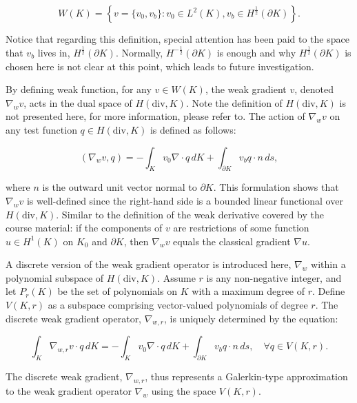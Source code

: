 \documentclass[12pt]{article} %
\begin{document}
\begin{equation}
    W(K) = \left\{ v = \{v_0, v_b\} : v_0 \in L^2(K), v_b \in H^{\frac{1}{2}}(\partial K) \right\}.
\end{equation}

Notice that regarding this definition, special attention has been paid to the space that $v_b$ lives in, $H^{\frac{1}{2}}(\partial K)$. Normally, $H^{-\frac{1}{2}}(\partial K)$ is enough and why $H^{\frac{1}{2}}(\partial K)$ is chosen here is not clear at this point, which leads to future investigation.

By defining weak function, for any \(v \in W(K)\), the weak gradient \(v\), denoted \(\nabla_w v\), acts in the dual space of \(H(\text{div}, K)\). Note the definition of \(H(\text{div}, K)\) is not presented here, for more information, please refer to\cite{Hu2019}. The action of \(\nabla_w v\) on any test function \(q \in H(\text{div}, K)\) is defined as follows:

\begin{equation}
    (\nabla_w v, q) = -\int_K v_0 \nabla \cdot q \, dK + \int_{\partial K} v_b q \cdot n \, ds,
\end{equation}

where \(n\) is the outward unit vector normal to \(\partial K\). This formulation shows that \(\nabla_w v\) is well-defined since the right-hand side is a bounded linear functional over \(H(\text{div}, K)\).
Similar to the definition of the weak derivative covered by the course material: if the components of \(v\) are restrictions of some function \(u \in H^1(K)\) on \(K_0\) and \(\partial K\), then \(\nabla_w v\) equals the classical gradient \(\nabla u\).

A discrete version of the weak gradient operator is introduced here, \(\nabla_w\) within a polynomial subspace of \(H(\text{div}, K)\). Assume \(r\) is any non-negative integer, and let \(P_r(K)\) be the set of polynomials on \(K\) with a maximum degree of \(r\). Define \(V(K, r)\) as a subspace comprising vector-valued polynomials of degree \(r\). The discrete weak gradient operator, \(\nabla_{w,r}\), is uniquely determined by the equation:

\begin{equation}
    \int_K \nabla_{w,r} v \cdot q \, dK = -\int_K v_0 \nabla \cdot q \, dK + \int_{\partial K} v_b q \cdot n \, ds, \quad \forall q \in V(K, r).
\end{equation}

The discrete weak gradient, \(\nabla_{w,r}\), thus represents a Galerkin-type approximation to the weak gradient operator \(\nabla_w\) using the space \(V(K, r)\). 
\end{document}
